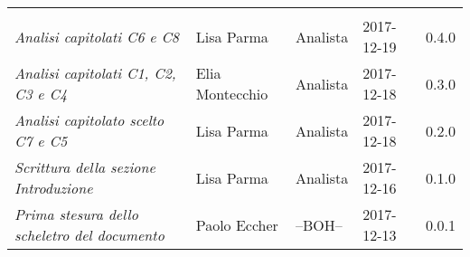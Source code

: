 \newpage 
\section*{}
\begin{table}[H]
	\centering
	\begin{tabular}{p{4cm}|C{3cm}|C{3cm}|R{2.5cm}|R{2cm}}
		
		 & & & & \\
		
		\emph{Analisi capitolati C6 e C8 } & Lisa Parma & Analista & 2017-12-19 & 0.4.0 \\
		\hline
		
		\emph{Analisi capitolati C1, C2, C3 e C4 } & Elia Montecchio & Analista & 2017-12-18 & 0.3.0 \\
		\hline
		
		\emph{Analisi capitolato scelto C7 e C5 } & Lisa Parma & Analista & 2017-12-18 & 0.2.0 \\
		\hline
		
		\emph{Scrittura della sezione Introduzione } & Lisa Parma & Analista & 2017-12-16 & 0.1.0 \\
		\hline
		
		\emph{Prima stesura dello scheletro del documento} & Paolo Eccher & --BOH-- & 2017-12-13 & 0.0.1 \\
		
	\end{tabular}
	
\end{table}


\clearpage